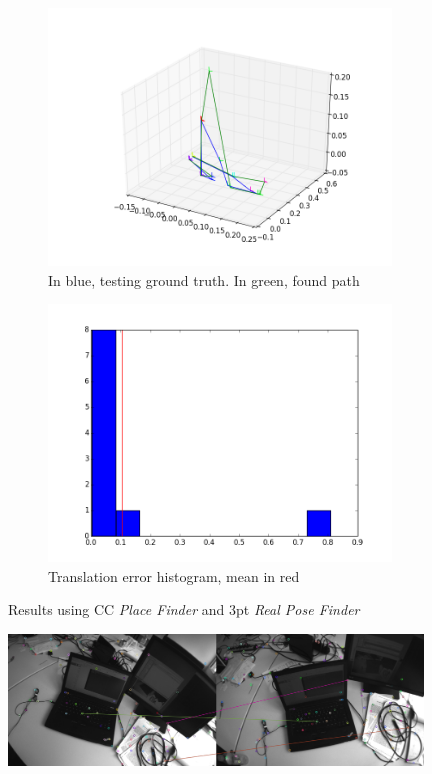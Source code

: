 \begin{figure}[htpb]
  \begin{subfigure}[b]{6cm}
          \includegraphics[width=\linewidth]{img/desktop_2_CC_3pt_path_1.png}
          \caption{In blue, testing ground truth. In green, found path}                
          \label{fig:desktop_2_CC_3pt_path_1}
  \end{subfigure}   
  \qquad
  \begin{subfigure}[b]{6cm}
          \includegraphics[width=\linewidth]{img/desktop_2_CC_3pt_dist_1.png}
          \caption{Translation error histogram, mean in red} 
          \label{fig:desktop_2_CC_3pt_dist_1}
  \end{subfigure}
  \caption{Results using CC \textit{Place Finder} and 3pt  \textit{Real Pose Finder}}
\end{figure}

\begin{figure}[htpb]
  \centering
  \includegraphics[width=11cm]{img/wrong_inlier.png}
  \caption{}
  \label{fig:wrong_inlier}
\end{figure}
